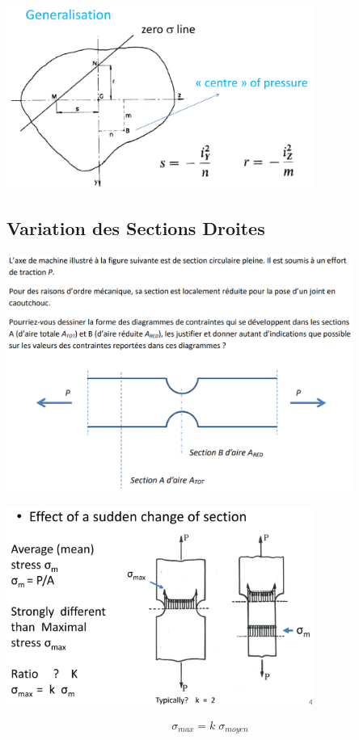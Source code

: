 \documentclass[a4paper]{article}
\begin{document}
\begin{center}
\includegraphics[width=0.75\textwidth]{images/noyaucentralg.PNG}
\end{center}





\subsection{Variation des Sections Droites}





\begin{center}
\includegraphics[width=0.85\textwidth]{images/enoncesection.PNG}
\end{center}

\begin{center}
\includegraphics[width=0.75\textwidth]{images/changementSection.PNG}
\end{center}
\[ \sigma_{max} = k \; \sigma_{moyen} \]
\end{document}
